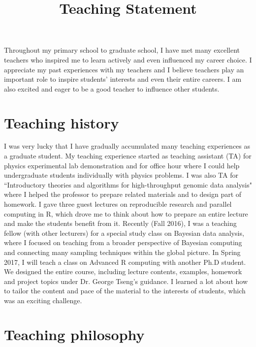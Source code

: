 \documentclass[12pt]{amsart} \usepackage{amssymb}
\title[]{Teaching Statement}
\begin{document}
\maketitle
\thispagestyle{empty}

Throughout my primary school to graduate school,
I have met many excellent teachers who inspired me to learn actively and even influenced my career choice. 
I appreciate my past experiences with my teachers 
and I believe teachers play an important role to inspire students' interests and even their entire careers.
I am also excited and eager to be a good teacher to influence other students.

\section{Teaching history}

I was very lucky that I have gradually accumulated many teaching experiences as a graduate student.
My teaching experience started as teaching assistant (TA) for physics experimental lab demonstration 
and for office hour where I could help undergraduate students individually with physics problems.
I was also TA for ``Introductory theories and algorithms for high-throughput genomic data analysis"
where I helped the professor to prepare related materials and to design part of homework.
I gave three guest lectures on reproducible research and parallel computing in R,
which drove me to think about how to prepare an entire lecture and make the students benefit from it.
Recently (Fall 2016), 
I was a teaching fellow (with other lecturers) for a special study class on Bayesian data analysis,
where I focused on teaching from a broader perspective of Bayesian computing and connecting many sampling techniques within the global picture.
In Spring 2017, I will teach a class on Advanced R computing with another Ph.D student.
We designed the entire course, including lecture contents, examples, homework and project topics
under Dr. George Tseng's guidance. 
I learned a lot about how to tailor the content and pace of the material to the interests of students, 
which was an exciting challenge.

\section{Teaching philosophy}
\end{document}
